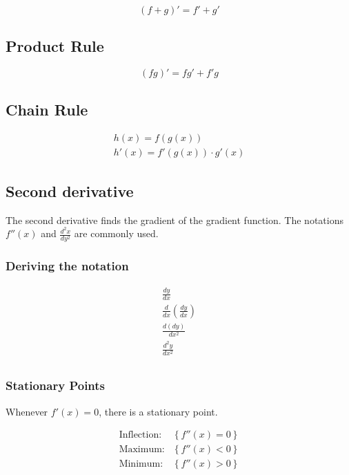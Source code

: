 \documentclass{article}
\begin{document}
\begin{equation}
	(f + g)' = f' + g'
\end{equation}

\subsection{Product Rule}

\begin{equation}
	(fg)' = fg' + f'g
\end{equation}

\subsection{Chain Rule}

\begin{gather}
	h(x) = f(g(x))\\
	h'(x) = f'(g(x)) \cdot g'(x) 
\end{gather}

\subsection{Second derivative}

The second derivative finds the gradient of the gradient function. The notations $f''(x)$ and $\frac{d^2x}{dy^2}$ are commonly used.

\subsubsection{Deriving the notation}

\begin{gather}
	\frac{dy}{dx} \\
	\frac{d}{dx} \left ( \frac{dy}{dx} \right )\\
	\frac{d(dy)}{dx^2} \\
	\frac{d^2y}{dx^2} \\
\end{gather}

\subsubsection{Stationary Points}
Whenever $f'(x) = 0$, there is a stationary point.

\begin{align*}
	\text{Inflection:} &\left \{ f''(x) = 0 \right \} \\
	\text{Maximum:} &\left \{ f''(x) < 0 \right \} \\
	\text{Minimum:} &\left \{ f''(x) > 0 \right \} \\
\end{align*}
\end{document}
